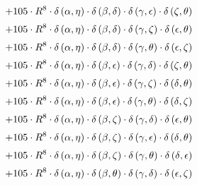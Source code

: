 \begin{subequations}
\begin{gather}
 \\[0.2em] \notag 		 + 105 \cdot R^{8} \cdot \delta{}\left(\alpha{}, \eta{}\right) \cdot \delta{}\left(\beta{}, \delta{}\right) \cdot \delta{}\left(\gamma{}, \epsilon{}\right) \cdot \delta{}\left(\zeta{}, \theta{}\right) 
 \\[0.2em] \notag 		 + 105 \cdot R^{8} \cdot \delta{}\left(\alpha{}, \eta{}\right) \cdot \delta{}\left(\beta{}, \delta{}\right) \cdot \delta{}\left(\gamma{}, \zeta{}\right) \cdot \delta{}\left(\epsilon{}, \theta{}\right) 
 \\[0.2em] \notag 		 + 105 \cdot R^{8} \cdot \delta{}\left(\alpha{}, \eta{}\right) \cdot \delta{}\left(\beta{}, \delta{}\right) \cdot \delta{}\left(\gamma{}, \theta{}\right) \cdot \delta{}\left(\epsilon{}, \zeta{}\right) 
 \\[0.2em] \notag 		 + 105 \cdot R^{8} \cdot \delta{}\left(\alpha{}, \eta{}\right) \cdot \delta{}\left(\beta{}, \epsilon{}\right) \cdot \delta{}\left(\gamma{}, \delta{}\right) \cdot \delta{}\left(\zeta{}, \theta{}\right) 
 \\[0.2em] \notag 		 + 105 \cdot R^{8} \cdot \delta{}\left(\alpha{}, \eta{}\right) \cdot \delta{}\left(\beta{}, \epsilon{}\right) \cdot \delta{}\left(\gamma{}, \zeta{}\right) \cdot \delta{}\left(\delta{}, \theta{}\right) 
 \\[0.2em] \notag 		 + 105 \cdot R^{8} \cdot \delta{}\left(\alpha{}, \eta{}\right) \cdot \delta{}\left(\beta{}, \epsilon{}\right) \cdot \delta{}\left(\gamma{}, \theta{}\right) \cdot \delta{}\left(\delta{}, \zeta{}\right) 
 \\[0.2em] \notag 		 + 105 \cdot R^{8} \cdot \delta{}\left(\alpha{}, \eta{}\right) \cdot \delta{}\left(\beta{}, \zeta{}\right) \cdot \delta{}\left(\gamma{}, \delta{}\right) \cdot \delta{}\left(\epsilon{}, \theta{}\right) 
 \\[0.2em] \notag 		 + 105 \cdot R^{8} \cdot \delta{}\left(\alpha{}, \eta{}\right) \cdot \delta{}\left(\beta{}, \zeta{}\right) \cdot \delta{}\left(\gamma{}, \epsilon{}\right) \cdot \delta{}\left(\delta{}, \theta{}\right) 
 \\[0.2em] \notag 		 + 105 \cdot R^{8} \cdot \delta{}\left(\alpha{}, \eta{}\right) \cdot \delta{}\left(\beta{}, \zeta{}\right) \cdot \delta{}\left(\gamma{}, \theta{}\right) \cdot \delta{}\left(\delta{}, \epsilon{}\right) 
 \\[0.2em] \notag 		 + 105 \cdot R^{8} \cdot \delta{}\left(\alpha{}, \eta{}\right) \cdot \delta{}\left(\beta{}, \theta{}\right) \cdot \delta{}\left(\gamma{}, \delta{}\right) \cdot \delta{}\left(\epsilon{}, \zeta{}\right) 

\end{gather}
\end{subequations}

